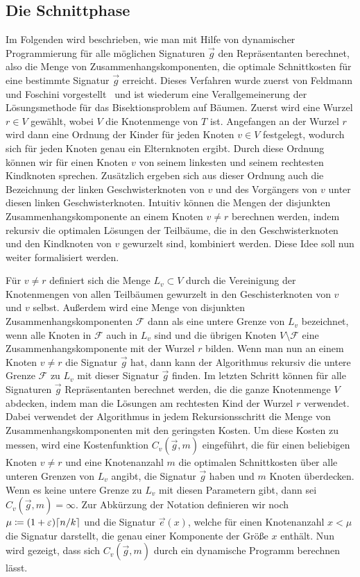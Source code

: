 \subsection{Die Schnittphase}\label{sec:cutting}
Im Folgenden wird beschrieben, wie man mit Hilfe von dynamischer Programmierung für alle möglichen Signaturen $\vec{g}$ den Repräsentanten berechnet, also die Menge von Zusammenhangskomponenten, die optimale Schnittkosten für eine bestimmte Signatur $\vec{g}$ erreicht.
Dieses Verfahren wurde zuerst von Feldmann und Foschini vorgestellt~\parencite{FF15} und ist wiederum eine Verallgemeinerung der Lösungsmethode für das Bisektionsproblem auf Bäumen. \parencite{mcg78, ws11}
Zuerst wird eine Wurzel $r \in V$ gewählt, wobei $V$ die Knotenmenge von $T$ ist. 
Angefangen an der Wurzel $r$ wird dann eine Ordnung der Kinder für jeden Knoten $v \in V$ festgelegt, wodurch sich für jeden Knoten genau ein Elternknoten ergibt.
Durch diese Ordnung können wir für einen Knoten $v$ von seinem linkesten und seinem rechtesten Kindknoten sprechen. 
Zusätzlich ergeben sich aus dieser Ordnung auch die Bezeichnung der linken Geschwisterknoten von $v$ und des Vorgängers von $v$ unter diesen linken Geschwisterknoten.
Intuitiv können die Mengen der disjunkten Zusammenhangskomponente an einem Knoten $v \neq r$ berechnen werden, indem rekursiv die optimalen Lösungen der Teilbäume, die in den Geschwisterknoten und den Kindknoten von $v$ gewurzelt sind, kombiniert werden.
Diese Idee soll nun weiter formalisiert werden.

Für $v \neq r$ definiert sich die Menge $L_v \subset V$ durch die Vereinigung der Knotenmengen von allen Teilbäumen gewurzelt in den Geschisterknoten von $v$ und $v$ selbst.
Außerdem wird eine Menge von disjunkten Zusammenhangskomponenten $\mathcal{F}$ dann als eine untere Grenze von $L_v$ bezeichnet, wenn alle Knoten in $\mathcal{F}$ auch in $L_v$ sind und die übrigen Knoten $V \setminus \mathcal{F}$ eine Zusammenhangskomponente mit der Wurzel $r$ bilden.
Wenn man nun an einem Knoten $v \neq r$ die Signatur $\vec{g}$ hat, dann kann der Algorithmus rekursiv die untere Grenze $\mathcal{F}$ zu $L_v$ mit dieser Signatur $\vec{g}$ finden.
Im letzten Schritt können für alle Signaturen $\vec{g}$ Repräsentanten berechnet werden, die die ganze Knotenmenge $V$ abdecken, indem man die Lösungen am rechtesten Kind der Wurzel $r$ verwendet.
Dabei verwendet der Algorithmus in jedem Rekursionsschritt die Menge von Zusammenhangskomponenten mit den geringsten Kosten. 
Um diese Kosten zu messen, wird eine Kostenfunktion $C_v(\vec{g}, m)$ eingeführt, die für einen beliebigen Knoten $v \neq r$ und eine Knotenanzahl $m$ die optimalen Schnittkosten über alle unteren Grenzen von $L_v$ angibt, die Signatur $\vec{g}$ haben und $m$ Knoten überdecken.
Wenn es keine untere Grenze zu $L_v$ mit diesen Parametern gibt, dann sei $C_v(\vec{g}, m) = \infty$.
Zur Abkürzung der Notation definieren wir noch $\mu \coloneqq (1+\eps)\ceil*{n/k}$ und die Signatur $\vec{e}(x)$, welche für einen Knotenanzahl $x < \mu$ die Signatur darstellt, die genau einer Komponente der Größe $x$ enthält.
Nun wird gezeigt, dass sich $C_v(\vec{g}, m)$ durch ein dynamische Programm berechnen lässt.

